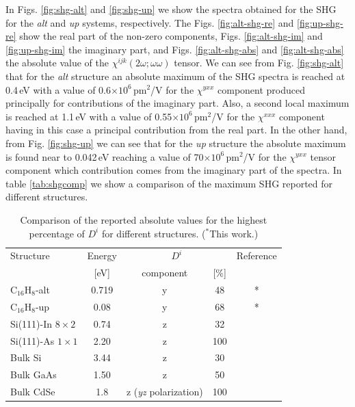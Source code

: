 \documentclass[aps,pra,11pt,tightenlines,showpacs,superscriptaddress,groupedaddress]{revtex4-1}
\newcommand{\di}{$D^{i}$}
\newcommand{\altstc}{C$_{16}$H$_{8}$-alt}
\newcommand{\upstc}{C$_{16}$H$_{8}$-up}
\begin{document}
In Figs. \ref{fig:shg-alt} and \ref{fig:shg-up} we show the spectra obtained
for the SHG for the \emph{alt} and \emph{up} systems, respectively. The
Figs. \ref{fig:alt-shg-re} and \ref{fig:up-shg-re} show the real part of the
non-zero components, Figs. \ref{fig:alt-shg-im} and \ref{fig:up-shg-im} the
imaginary part, and Figs. \ref{fig:alt-shg-abs} and \ref{fig:alt-shg-abs} the
absolute value of the $\chi^{ijk}(2\omega;\omega\omega) $ tensor. We can see
from Fig. \ref{fig:shg-alt} that for the \emph{alt} structure an absolute
maximum of the SHG spectra is reached at 0.4\,eV with a value of
0.6$\times10^{6} $\,pm$^{2}$/V for the $\chi^{yxx} $ component produced
principally for contributions of the imaginary part. Also, a second local
maximum is reached at 1.1\,eV with a value of 0.55$\times10^{6} $\,pm$^{2}$/V
for the $\chi^{xxx} $ component having in this case a principal contribution
from the real part. In the other hand, from Fig. \ref{fig:shg-up} we can see that for the
\emph{up} structure the absolute maximum is found near to 0.042\,eV reaching a
value of 70$\times10^{6} $\,pm$^{2}$/V for the $\chi^{yxx} $ tensor component
which contribution comes from the imaginary part of the spectra. In table
\ref{tab:shgcomp} we show a comparison of the maximum SHG reported for
different structures.


\begin{table}
    \caption{Comparison of the reported absolute values for the highest 
    percentage of {\di} for different structures. ($^{*}$This work.)}
    \label{tab:dacomp}
    \centering
    \begin{ruledtabular}
    \begin{tabular}{lcccc}
    Structure & Energy &  \multicolumn{2}{c}{\di} &  Reference\\
    \cline{3-4}
              & [eV]   & component & [\%] \\
    \hline
    {\altstc}               & 0.719 & y & 48 & *     \\
    {\upstc}                & 0.08  & y & 68 & *     \\
    Si(111)-In $8\times2$   & 0.74  & z & 32 & \cite{arzate2014optical}  \\
    Si(111)-As $1\times1$   & 2.20  & z & 100& \cite{mendoza2012optical} \\
    Bulk Si                 & 3.44  & z & 30 & \cite{nastos2007full}     \\
    Bulk GaAs               & 1.50  & z & 50 & \cite{nastos2007full} 
    \cite{bhat2005excitonic} \\
    Bulk CdSe               & 1.8   & z {\scriptsize (\emph{yz} polarization)} 
    & 100& \cite{nastos2007full}\\
    \end{tabular}
    \end{ruledtabular}
\end{table}
\end{document}
